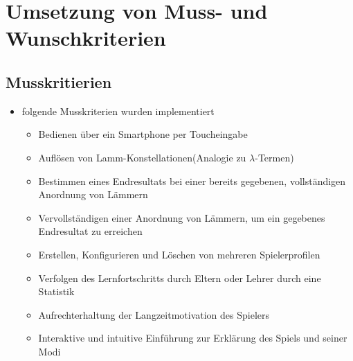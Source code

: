 \section{Umsetzung von Muss- und Wunschkriterien}

\subsection{Musskritierien}
\begin{itemize}
\item folgende Musskriterien wurden implementiert
\begin{itemize} 
\item Bedienen über ein Smartphone per Toucheingabe
	\item Auflösen von Lamm-Konstellationen(Analogie zu $\lambda$-Termen)
	
		\item Bestimmen eines Endresultats bei einer bereits gegebenen, vollständigen Anordnung von Lämmern 
		\item Vervollständigen einer Anordnung von Lämmern, um ein gegebenes Endresultat zu erreichen
	
	\item Erstellen, Konfigurieren und Löschen von mehreren Spielerprofilen
	\item Verfolgen des Lernfortschritts durch Eltern oder Lehrer durch eine Statistik
	\item Aufrechterhaltung der Langzeitmotivation des Spielers
	\item Interaktive und intuitive Einführung zur Erklärung des Spiels und seiner Modi
	\end{itemize}
\end{itemize}

